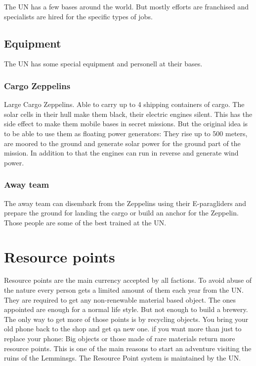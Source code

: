 The UN has a few bases around the world. But mostly efforts are franchised and specialists are hired for the specific types of jobs.

\subsection{Equipment}

The UN has some special equipment and personell at their bases.

\subsubsection{Cargo Zeppelins}
\label{sec: UN Cargo Zeppelins}
Large Cargo Zeppelins. Able to carry up to 4 shipping containers of cargo. The solar cells in their hull make them black, their electric engines silent. This has the side effect to make them mobile bases in secret missions. But the original idea is to be able to use them as floating power generators: They rise up to 500 meters, are moored to the ground and generate solar power for the ground part of the mission. In addition to that the engines can run in reverse and generate wind power.

\subsubsection{Away team}
\label{sec: UN away team}
The away team can disembark from the Zeppelins using their E-paragliders and prepare the ground for landing the cargo or build an anchor for the Zeppelin. Those people are some of the best trained at the UN.


\section{Resource points}
\label{sec:Resource Points}
Resource points are the main currency accepted by all factions. To avoid abuse of the nature every person gets a limited amount of them each year from the UN. They are required to get any non-renewable material based object. The ones appointed are enough for a normal life style. But not enough to build a brewery. The only way to get more of those points is by recycling objects. You bring your old phone back to the shop and get qa new one. if you want more than just to replace your phone: Big objects or those made of rare materials return more resource points. This is one of the main reasons to start an adventure visiting the ruins of the Lemminsgs. The Resource Point system is maintained by the UN. 



